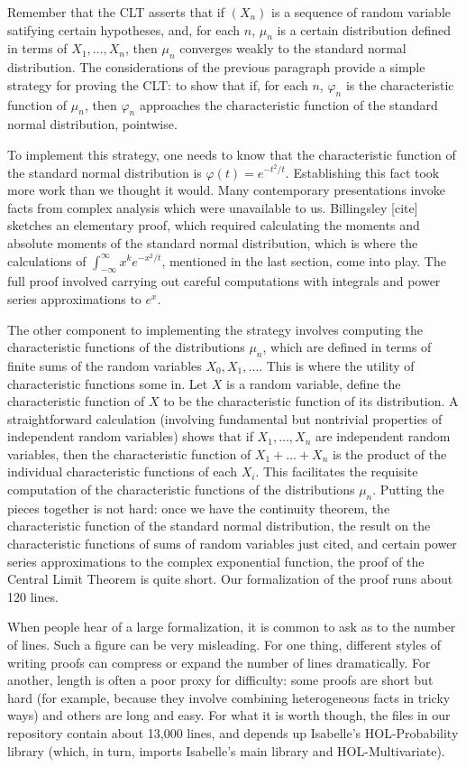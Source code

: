 \documentclass{article}
\newcommand{\ph}{\varphi}
\begin{document}
Remember that the CLT asserts that if $(X_n)$ is a sequence of random variable satifying certain hypotheses, and, for each $n$, $\mu_n$ is a certain distribution defined in terms of $X_1, \ldots, X_n$, then $\mu_n$ converges weakly to the standard normal distribution. The considerations of the previous paragraph provide a simple strategy for proving the CLT: to show that if, for each $n$, $\ph_n$ is the characteristic function of $\mu_n$, then $\ph_n$ approaches the characteristic function of the standard normal distribution, pointwise.

To implement this strategy, one needs to know that the characteristic function of the standard normal distribution is $\ph(t) = e^{-t^2/t}$. Establishing this fact took more work than we thought it would. Many contemporary presentations invoke facts from complex analysis which were unavailable to us. Billingsley [cite] sketches an elementary proof, which required calculating the moments and absolute moments of the standard normal distribution, which is where the calculations of $\int_{-\infty}^\infty x^k e^{-x^2 / t}$, mentioned in the last section, come into play. The full proof involved carrying out careful computations with integrals and power series approximations to $e^x$.

The other component to implementing the strategy involves computing the characteristic functions of the distributions $\mu_n$, which are defined in terms of finite sums of the random variables $X_0, X_1, \ldots$. This is where the utility of characteristic functions some in. Let $X$ is a random variable, define the characteristic function of $X$ to be the characteristic function of its distribution. A straightforward calculation (involving fundamental but nontrivial properties of independent random variables) shows that if $X_1, \ldots, X_n$ are independent random variables, then the characteristic function of $X_1 + \ldots + X_n$ is the product of the individual characteristic functions of each $X_i$. This facilitates the requisite computation of the characteristic functions of the distributions $\mu_n$. Putting the pieces together is not hard: once we have the continuity theorem, the characteristic function of the standard normal distribution, the result on the characteristic functions of sums of random variables just cited, and certain power series approximations to the complex exponential function, the proof of the Central Limit Theorem is quite short. Our formalization of the proof runs about 120 lines. 

When people hear of a large formalization, it is common to ask as to the number of lines. Such a figure can be very misleading. For one thing, different styles of writing proofs can compress or expand the number of lines dramatically. For another, length is often a poor proxy for difficulty: some proofs are short but hard (for example, because they involve combining heterogeneous facts in tricky ways) and others are long and easy. For what it is worth though, the files in our repository contain about 13,000 lines, and depends up Isabelle's HOL-Probability library (which, in turn, imports Isabelle's main library and HOL-Multivariate).
\end{document}
